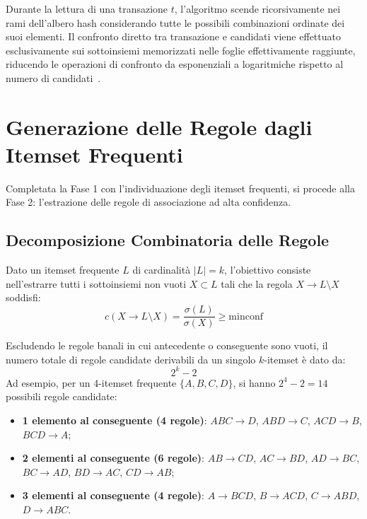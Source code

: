 Durante la lettura di una transazione $t$, l'algoritmo scende ricorsivamente nei rami dell'albero hash considerando tutte le possibili combinazioni ordinate dei suoi elementi. Il confronto diretto tra transazione e candidati viene effettuato esclusivamente sui sottoinsiemi memorizzati nelle foglie effettivamente raggiunte, riducendo le operazioni di confronto da esponenziali a logaritmiche rispetto al numero di candidati~\cite{tan2018}.

\FloatBarrier
\section{Generazione delle Regole dagli Itemset Frequenti}
\label{sec:dm-rule-generation}

Completata la Fase 1 con l'individuazione degli itemset frequenti, si procede alla Fase 2: l'estrazione delle regole di associazione ad alta confidenza.

\FloatBarrier
\subsection{Decomposizione Combinatoria delle Regole}
Dato un itemset frequente $L$ di cardinalità $|L| = k$, l'obiettivo consiste nell'estrarre tutti i sottoinsiemi non vuoti $X \subset L$ tali che la regola $X \rightarrow L \setminus X$ soddisfi:
\begin{equation}
c(X \longrightarrow L \setminus X) = \frac{\sigma(L)}{\sigma(X)} \ge \mathrm{minconf}
\end{equation}

Escludendo le regole banali in cui antecedente o conseguente sono vuoti, il numero totale di regole candidate derivabili da un singolo $k$-itemset è dato da:
\begin{equation}
2^k - 2
\end{equation}
Ad esempio, per un 4-itemset frequente $\{A, B, C, D\}$, si hanno $2^4 - 2 = 14$ possibili regole candidate:
\begin{itemize}[noitemsep]
    \item \textbf{1 elemento al conseguente (4 regole)}: $ABC \rightarrow D$, $ABD \rightarrow C$, $ACD \rightarrow B$, $BCD \rightarrow A$;
    \item \textbf{2 elementi al conseguente (6 regole)}: $AB \rightarrow CD$, $AC \rightarrow BD$, $AD \rightarrow BC$, $BC \rightarrow AD$, $BD \rightarrow AC$, $CD \rightarrow AB$;
    \item \textbf{3 elementi al conseguente (4 regole)}: $A \rightarrow BCD$, $B \rightarrow ACD$, $C \rightarrow ABD$, $D \rightarrow ABC$.
\end{itemize}


